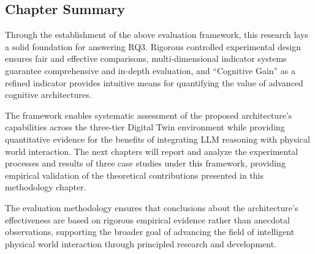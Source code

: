 \subsection{Chapter Summary}

Through the establishment of the above evaluation framework, this research lays a solid foundation for answering RQ3. Rigorous controlled experimental design ensures fair and effective comparisons, multi-dimensional indicator systems guarantee comprehensive and in-depth evaluation, and ``Cognitive Gain'' as a refined indicator provides intuitive means for quantifying the value of advanced cognitive architectures.

The framework enables systematic assessment of the proposed architecture's capabilities across the three-tier Digital Twin environment while providing quantitative evidence for the benefits of integrating LLM reasoning with physical world interaction. The next chapters will report and analyze the experimental processes and results of three case studies under this framework, providing empirical validation of the theoretical contributions presented in this methodology chapter.

The evaluation methodology ensures that conclusions about the architecture's effectiveness are based on rigorous empirical evidence rather than anecdotal observations, supporting the broader goal of advancing the field of intelligent physical world interaction through principled research and development.